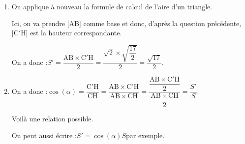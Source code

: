 \begin{enumerate}
\begin{enumerate}
Ainsi, on vient de démontrer que C, C$'$ et H définissent un plan, et que deux droites sécantes du plan (CC'H) sont orthogonales à (AB), donc que (AB) est orthogonale au plan (CC$'$H) et donc à toutes les droites de ce plan là, notamment à la droite (C$'$H).

		\emph{Remarque :} le plan (CC$'$H) est ce que l'on appelle le \textbf{plan médiateur} du segment [AB] : le plan qui passe par le milieu (H) du segment et lui est perpendiculaire.

		\item On applique à nouveau la formule de calcul de l'aire d'un triangle.

Ici, on va prendre [AB] comme base et donc, d'après la question précédente, [C$'$H] est la hauteur correspondante.

On a donc :\quad $S' = \dfrac{\mathrm{AB}\times \mathrm{C'H}}{2} = \dfrac{\sqrt{2} \times \sqrt{\dfrac{17}{2}}}{2} = \dfrac{\sqrt{17}}{2}$.

		\item On a donc :\quad $\cos(\alpha ) = \dfrac{\mathrm{C'H}}{\mathrm{CH}} = \dfrac{\mathrm{AB} \times \mathrm{C'H}}{\mathrm{AB} \times \mathrm{CH}}= \dfrac{\dfrac{\mathrm{AB} \times \mathrm{C'H}}{2}}{\dfrac{\mathrm{AB} \times \mathrm{CH}}{2}} = \dfrac{S'}{S}$.

Voilà une relation possible.

On peut aussi écrire :\quad $S' = \cos(\alpha)S$\quad par exemple.
	\end{enumerate}
\end{enumerate}
